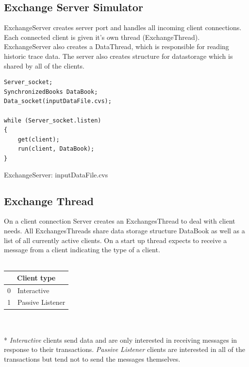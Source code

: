 \documentclass[11pt]{article}
\begin{document}
\subsection{Exchange Server Simulator}
ExchangeServer creates server port and handles all incoming client connections. Each connected client is given it's own thread (ExchangeThread). ExchangeServer also creates a DataThread, which is responsible for reading historic trace data. The server also creates structure for datastorage which is shared by all of the clients.

\begin{code}
  \begin{verbatim}
Server_socket;
SynchronizedBooks DataBook;
Data_socket(inputDataFile.cvs);

while (Server_socket.listen)
{
	get(client);
	run(client, DataBook);
}
  \end{verbatim}
  \caption{ExchangeServer: inputDataFile.cvs}
\end{code}



\subsection{Exchange Thread}
On a client connection Server creates an ExchangesThread to deal with client needs. All ExchangesThreads share data storage structure DataBook as well as a list of all currently active clients. On a start up thread expects to receive a message from a client indicating the type of a client.
\\
\\
\begin{tabular}{|l|l|}
  \hline
  \multicolumn{2}{|c|}{Client type} \\
  \hline
  0 & Interactive\\ \hline
  1 & Passive Listener \\
  \hline
\end{tabular}
\\
\\*
\emph{Interactive} clients send data and are only interested in receiving messages in response to their transactions. \emph{Passive Listener} clients are interested in all of the transactions but tend not to send the messages themselves.
\end{document}
